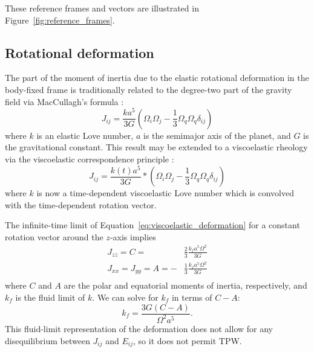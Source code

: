 \documentclass[preprint,12pt,authoryear]{elsarticle}
\begin{document}
These reference frames and vectors are illustrated in Figure~\ref{fig:reference_frames}.


\subsection{Rotational deformation}
\label{sec:rotational_deformation}

The part of the moment of inertia due to the elastic rotational deformation in the body-fixed frame 
is traditionally related to the degree-two part of the gravity field via MacCullagh's formula \citep{munk1960rotation}:
\begin{equation}
J_{ij} = \frac{k a^5}{3 G} \left( \Omega_i \Omega_j - \frac{1}{3} \Omega_q \Omega_q \delta_{ij} \right)
\label{eq:elastic_deformation}
\end{equation}
where $k$ is an elastic Love number, $a$ is the semimajor axis of the planet, and $G$ is the gravitational constant.
This result may be extended to a viscoelastic rheology via the viscoelastic correspondence principle \citep[e.g.][]{peltier1974impulse}:
\begin{equation}
J_{ij} = \frac{k(t) a^5}{3 G} * \left( \Omega_i \Omega_j - \frac{1}{3} \Omega_q \Omega_q \delta_{ij} \right)
\label{eq:viscoelastic_deformation}
\end{equation}
where $k$ is now a time-dependent viscoelastic Love number which is convolved with the time-dependent rotation vector.

The infinite-time limit of Equation~\eqref{eq:viscoelastic_deformation} for a 
constant rotation vector around the $z$-axis implies
\begin{equation}
\begin{aligned}
J_{zz} = C = &\frac{2}{3} \frac{k_f a^5 \Omega^2}{3 G} \\
J_{xx} = J_{yy} = A = -&\frac{1}{3} \frac{k_f a^5 \Omega^2}{3 G} \\
\end{aligned}
\end{equation}
where $C$ and $A$ are the polar and equatorial moments of inertia, respectively, 
and $k_f$ is the fluid limit of $k$. 
We can solve for $k_f$ in terms of $C-A$:
\begin{equation}
k_f = \frac{3 G (C-A)}{\Omega^2 a^5}.
\label{eq:fluid_love}
\end{equation}
This fluid-limit representation of the deformation does not allow for any disequilibrium between $J_{ij}$ and $E_{ij}$,
so it does not permit TPW.
\end{document}
